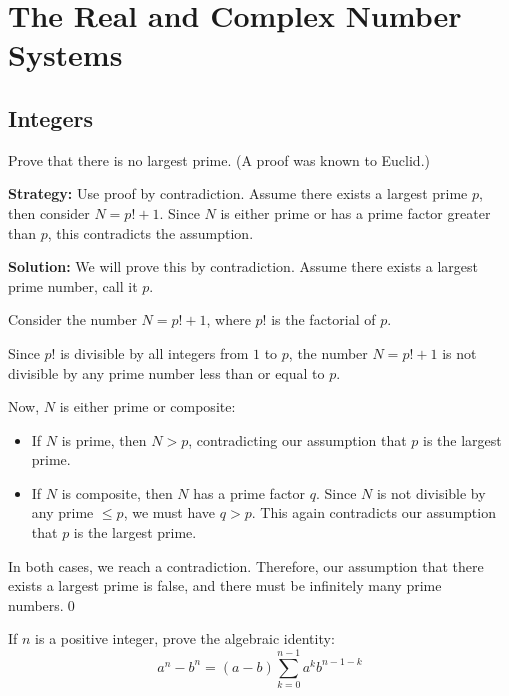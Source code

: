 \chapter{The Real and Complex Number Systems}

\section{Integers}

\begin{problembox}
\begin{problemstatement}
Prove that there is no largest prime. (A proof was known to Euclid.)
\end{problemstatement}
\end{problembox}

\noindent\textbf{Strategy:} Use proof by contradiction. Assume there exists a largest prime $p$, then consider $N = p! + 1$. Since $N$ is either prime or has a prime factor greater than $p$, this contradicts the assumption.

\bigskip\noindent\textbf{Solution:}
We will prove this by contradiction. Assume there exists a largest prime number, call it $p$.

Consider the number $N = p! + 1$, where $p!$ is the factorial of $p$. 

Since $p!$ is divisible by all integers from $1$ to $p$, the number $N = p! + 1$ is not divisible by any prime number less than or equal to $p$.

Now, $N$ is either prime or composite:
\begin{itemize}
\item If $N$ is prime, then $N > p$, contradicting our assumption that $p$ is the largest prime.
\item If $N$ is composite, then $N$ has a prime factor $q$. Since $N$ is not divisible by any prime $\leq p$, we must have $q > p$. This again contradicts our assumption that $p$ is the largest prime.
\end{itemize}

In both cases, we reach a contradiction. Therefore, our assumption that there exists a largest prime is false, and there must be infinitely many prime numbers.\qed



\begin{problembox}
\begin{problemstatement}
If $n$ is a positive integer, prove the algebraic identity:
\[
a^n - b^n = (a - b)\sum_{k=0}^{n-1} a^k b^{n-1-k}
\]
\end{problemstatement}
\end{problembox}

